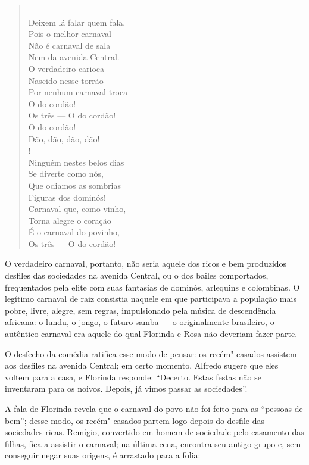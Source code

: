 \begin{hedraquote} 
\begin{verse}
\hspace{-1cm}\\ 
Deixem lá falar quem fala,\\
Pois o melhor carnaval\\
Não é carnaval de sala\\
Nem da avenida Central.\\
O verdadeiro carioca\\
Nascido nesse torrão\\
Por nenhum carnaval troca\\
O do cordão!\\
Os três --- O do cordão!\\
O do cordão!\\
Dão, dão, dão, dão!\\!
\hspace{-1cm} \\
Ninguém nestes belos dias\\
Se diverte como nós,\\
Que odiamos as sombrias\\
Figuras dos dominós!\\
Carnaval que, como vinho,\\
Torna alegre o coração\\
É o carnaval do povinho,\\
Os três --- O do cordão! 
\end{verse}
\end{hedraquote} 

O verdadeiro carnaval, portanto, não seria aquele dos ricos e bem
produzidos desfiles das sociedades na avenida Central, ou o dos bailes
comportados, frequentados pela elite com suas fantasias de dominós,
arlequins e colombinas. O legítimo carnaval de raiz consistia naquele
em que participava a população mais pobre, livre, alegre, sem regras,
impulsionado pela música de descendência africana: o lundu, o jongo, o
futuro samba --- o originalmente brasileiro, o autêntico carnaval era
aquele do qual Florinda e Rosa não deveriam fazer parte. 

O desfecho da comédia ratifica esse modo de pensar: os recém"-casados
assistem aos desfiles na avenida Central; em certo momento, Alfredo
sugere que eles voltem para a casa, e Florinda responde:
``Decerto. Estas festas não se inventaram para os noivos. Depois, já
vimos passar as sociedades''.

A fala de Florinda revela que o carnaval do povo não foi feito para as
“pessoas de bem”; desse modo, os recém"-casados partem logo depois do
desfile das sociedades ricas. Remígio, convertido em homem de sociedade
pelo casamento das filhas, fica a assistir o carnaval; na última cena,
encontra seu antigo grupo e, sem conseguir negar suas origens, é
arrastado para a folia:

